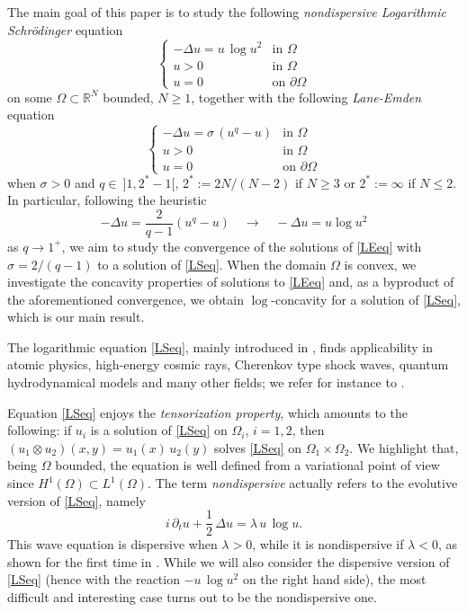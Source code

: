 \documentclass[12pt]{amsart}
\numberwithin{equation}{section}
\theoremstyle{plain}
\theoremstyle{plain}
\theoremstyle{plain}
\theoremstyle{definition}
\newcommand{\R}{{\mathbb R}}
\newcommand{\beq}{\begin{equation}}
\newcommand{\eeq}{\end{equation}}
\renewcommand{\le}{\leqslant}
\begin{document}
The main goal of this paper is to study the following \emph{nondispersive Logarithmic Schrödinger} equation
\beq
\label{LSeq}
\begin{cases}
-\Delta u=u\, \log u^2& \text{in $\Omega$}\\
u>0&\text{in $\Omega$}\\
u=0&\text{on $\partial\Omega$}
\end{cases}
\eeq
on some $\Omega \subset \R^N$ bounded, $N\geq 1$, together with the following \emph{Lane-Emden} equation
\beq
\label{LEeq}
\begin{cases}
-\Delta u=\sigma\, (u^q-u)&\text{in $\Omega$}\\
u>0&\text{in $\Omega$}\\
u=0&\text{on $\partial\Omega$}
\end{cases}
\eeq
when $\sigma>0$ and $q \in\ ]1, 2^*-1[$, $2^*:=2N/(N-2)$ if $N\geq 3$ or $2^*:=\infty$ if $N\le 2$.
In particular, following the heuristic 
\beq
\label{heu}
-\Delta u=\frac{2}{q-1} (u^q-u) \quad \longrightarrow\quad -\Delta u= u\log u^2
\eeq
 as $q \to 1^+$, we aim to study the convergence of the solutions of \eqref{LEeq} with $\sigma = 2/(q-1)$ to a solution of \eqref{LSeq}. 
When the domain $\Omega$ is convex, we investigate the concavity properties of solutions to \eqref{LEeq} and, as a byproduct of the aforementioned convergence, we obtain $\log$-concavity for a solution of \eqref{LSeq}, which is our main result.

\medskip

The logarithmic equation \eqref{LSeq}, mainly introduced in \cite{BBM76}, finds applicability in atomic physics, high-energy cosmic rays, Cherenkov type shock waves, quantum hydrodynamical models and many other fields; we refer for instance to \cite{Zlo10, Par24, Hef85, GLN10, Car22}. 
 
Equation \eqref{LSeq} enjoys the \emph{tensorization property}, which amounts to the following: if $u_i$ is a solution of \eqref{LSeq} on $\Omega_i$, $i=1,2$, then $(u_1\otimes u_2) (x, y)= u_1(x)\, u_2(y)$ solves \eqref{LSeq} on $\Omega_1 \times \Omega_2$.
We highlight that, being $\Omega$ bounded, the equation is well defined from a variational point of view since $H^1(\Omega) \subset L^1(\Omega)$. The term {\em nondispersive} actually refers to the evolutive version of \eqref{LSeq}, namely
\[
i\, \partial_t u+\frac{1}{2}\, \Delta u= \lambda\, u\, \log u.
\]
This wave equation is dispersive when $\lambda>0$, while it is nondispersive if $\lambda<0$, as shown for the first time in \cite{Caz83}. While we will also consider the dispersive version of \eqref{LSeq} (hence with the reaction $-u\, \log u^2$ on the right hand side), the most difficult and interesting case turns out to be the nondispersive one.
\end{document}
